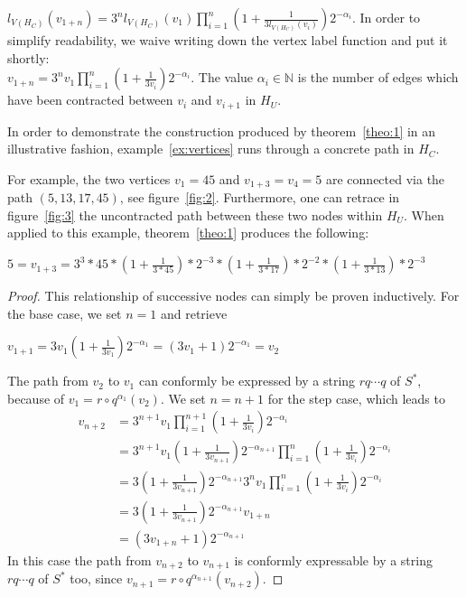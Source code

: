 \par\medskip
\begin{theorem}
	\label{theo:1}
	$l_{V(H_C)}(v_{1+n})=3^nl_{V(H_C)}(v_1)\prod_{i=1}^{n}\left(1+\frac{1}{3l_{V(H_C)}(v_{i})}\right)2^{-\alpha_i}$.
	In order to simplify readability, we waive writing down the vertex label function and put it shortly:\\
	$v_{1+n}=3^nv_1\prod_{i=1}^{n}\left(1+\frac{1}{3v_{i}}\right)2^{-\alpha_i}$.
	The value $\alpha_i\in\mathbb{N}$ is the number of edges which have been contracted between $v_i$ and $v_{i+1}$ in $H_U$.
\end{theorem}

In order to demonstrate the construction produced by theorem~\ref{theo:1} in an illustrative fashion, example~\ref{ex:vertices} runs through a concrete path in $H_C$.

\par\medskip
\begin{example}
	\label{ex:vertices}
	For example, the two vertices $v_1=45$ and $v_{1+3}=v_4=5$ are 
	connected
	via the path $(5,13,17,45)$, see figure~\ref{fig:2}. Furthermore, one
	can retrace in figure~\ref{fig:3} the uncontracted path between these
	two nodes within $H_U$. When applied to this example,
	theorem~\ref{theo:1} produces the following:	
	\begin{center}
		$5=v_{1+3}=3^3*45*\left(1+\frac{1}{3*45}\right)*2^{-3}
		*\left(1+\frac{1}{3*17}\right)*2^{-2}
		*\left(1+\frac{1}{3*13}\right)*2^{-3}$
	\end{center} 
\end{example}
\begin{proof}
	\label{proof:1}
	This relationship of successive nodes can simply be proven inductively. For the base case, we set $n=1$ and retrieve
	\begin{center}
		$v_{1+1}=3v_1\left(1+\frac{1}{3v_1}\right)2^{-\alpha_1}
		=\left(3v_1+1\right)2^{-\alpha_1}=v_2$
	\end{center}
	The path from $v_2$ to $v_1$ can conformly be expressed by a string $rq\cdots q$ of $S^*$, because of $v_1=r\circ q^{\alpha_1}\left(v_2\right)$. We set $n=n+1$ for the step case, which leads to
	\begin{equation*}
	\begin{array}{cl}
	v_{n+2} &
	=3^{n+1}v_1\prod_{i=1}^{n+1}\left(1+\frac{1}{3v_i}\right)2^{-\alpha_i}\\
	&
	=3^{n+1}v_1\left(1+\frac{1}{3v_{n+1}}\right)2^{-\alpha_{n+1}}\prod_{i=1}^{n}\left(1+\frac{1}{3v_i}\right)2^{-\alpha_i}\\
	&
	=3\left(1+\frac{1}{3v_{n+1}}\right)2^{-\alpha_{n+1}}3^nv_1\prod_{i=1}^{n}\left(1+\frac{1}{3v_i}\right)2^{-\alpha_i}\\
	&
	=3\left(1+\frac{1}{3v_{n+1}}\right)2^{-\alpha_{n+1}}v_{1+n}\\
	&
	=\left(3v_{1+n}+1\right)2^{-\alpha_{n+1}}
	\end{array}
	\end{equation*}
	In this case the path from $v_{n+2}$ to $v_{n+1}$ is conformly 
	expressable by a string $rq\cdots q$ of $S^*$ too, since
	$v_{n+1}=r\circ q^{\alpha_{n+1}}\left(v_{n+2}\right)$.
\end{proof}

